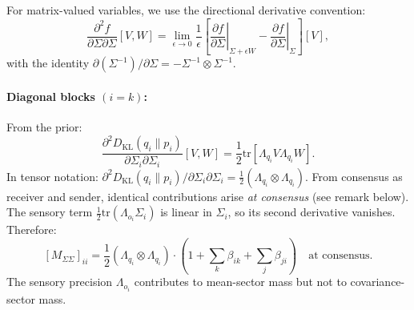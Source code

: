 \documentclass[11pt]{article}
\begin{document}
For matrix-valued variables, we use the directional derivative convention:
\begin{equation}
\frac{\partial^2 f}{\partial \Sigma \partial \Sigma}[V, W] = \lim_{\epsilon \to 0} \frac{1}{\epsilon}\left[\left.\frac{\partial f}{\partial \Sigma}\right|_{\Sigma + \epsilon W} - \left.\frac{\partial f}{\partial \Sigma}\right|_{\Sigma}\right][V],
\end{equation}
with the identity $\partial(\Sigma^{-1})/\partial \Sigma = -\Sigma^{-1} \otimes \Sigma^{-1}$.

\paragraph{Diagonal blocks $(i = k)$:} From the prior:
\begin{equation}
\frac{\partial^2 D_{\mathrm{KL}}(q_i \| p_i)}{\partial \Sigma_i \partial \Sigma_i}[V, W] = \frac{1}{2}\mathrm{tr}[\Lambda_{q_i} V \Lambda_{q_i} W].
\end{equation}
In tensor notation: $\partial^2 D_{\mathrm{KL}}(q_i \| p_i)/\partial \Sigma_i \partial \Sigma_i = \frac{1}{2}(\Lambda_{q_i} \otimes \Lambda_{q_i})$. From consensus as receiver and sender, identical contributions arise \emph{at consensus} (see remark below). The sensory term $\frac{1}{2}\mathrm{tr}(\Lambda_{o_i}\Sigma_i)$ is linear in $\Sigma_i$, so its second derivative vanishes. Therefore:
\begin{equation}
\boxed{[M_{\Sigma\Sigma}]_{ii} = \frac{1}{2}(\Lambda_{q_i} \otimes \Lambda_{q_i}) \cdot \left(1 + \sum_k \beta_{ik} + \sum_j \beta_{ji}\right) \quad \text{at consensus.}}
\label{eq:mass_sigma_diagonal}
\end{equation}
The sensory precision $\Lambda_{o_i}$ contributes to mean-sector mass but not to covariance-sector mass.
\end{document}
